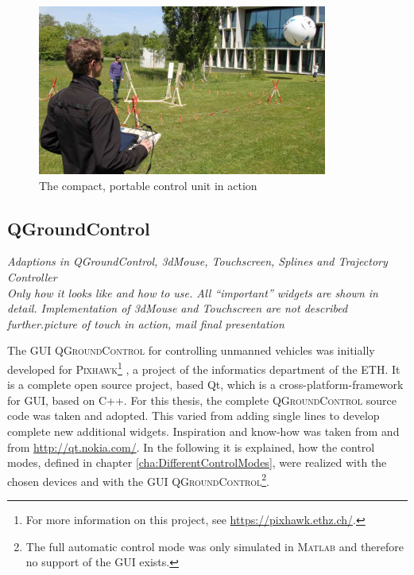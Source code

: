 \begin{figure}[H]
	\begin{center}
		\includegraphics[width=0.85\textwidth]{graphics/HMI_in_Action}
		\caption{The compact, portable control unit in action}  
		\label{fig:HMI_in_Action}
	\end{center}
\end{figure}



\subsection{QGroundControl}
\label{subsec:qGroundControl}
\textit{Adaptions in QGroundControl, 3dMouse, Touchscreen, Splines and Trajectory Controller \\ Only how it looks like and how to use. All ``important'' widgets are shown in detail. Implementation of 3dMouse and Touchscreen are not described further.picture of touch in action, mail final presentation}

The GUI \textsc{QGroundControl} for controlling unmanned vehicles was initially developed for \textsc{Pixhawk}\footnote{For more information on this project, see \url{https://pixhawk.ethz.ch/}.} , a project of the informatics department of the \textsc{ETH}. It is a complete open source project, based Qt, which is a cross-platform-framework for GUI, based on C++. For this thesis, the complete \textsc{QGroundControl} source code was taken and adopted. This varied from adding single lines to develop complete new additional widgets. Inspiration and know-how was taken from \cite{blanchette} and from \url{http://qt.nokia.com/}. In the following it is explained, how the control modes, defined in chapter \ref{cha:DifferentControlModes}, were realized with the chosen devices and with the GUI \textsc{QGroundControl}\footnote{The full automatic control mode was only simulated in \textsc{Matlab} and therefore no support of the GUI exists.}.





